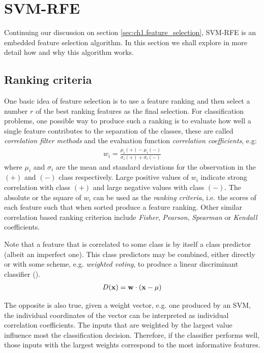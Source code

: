 \section{SVM-RFE}

Continuing our discussion on section \ref{sec:ch1.feature_selection}, SVM-RFE is an embedded feature se\-lec\-tion algorithm. In this section we shall explore in more detail how and why this algorithm works.

\subsection{Ranking criteria}
\label{sec:ch4.rfe.criteria}

One basic idea of feature selection is to use a feature ranking and then select a number $r$ of the best ranking features as the final selection. For classification prob\-lems, one possible way to produce such a ranking is to evaluate how well a single feature contributes to the separation of the classes, these are called \emph{correlation filter methods} and the evaluation function \emph{correlation coefficients}, e.g:
\begin{align*}
    w_i = \frac{\mu_i(+) - \mu_i(-)}{\sigma_i(+) + \sigma_i(-)} 
\end{align*}
where $\mu_i$ and $\sigma_i$ are the mean and standard deviations for the observation in the $(+)$ and $(-)$ class respectively. Large positive values of $w_i$ indicate strong correlation with class $(+)$ and large negative values with class $(-)$. The absolute or the square of $w_i$ can be used as the \emph{ranking criteria}, i.e. the scores of each feature such that when sorted produce a feature ranking. Other similar correlation based ranking criterion include \emph{Fisher}, \emph{Pearson}, \emph{Spearman} or \emph{Kendall} coefficients.

Note that a feature that is correlated to some class is by itself a class predictor (albeit an imperfect one). This class predictors may be combined, either directly or with some scheme, e.g. \emph{weighted voting}, to produce a linear discriminant classifier (\cite{guyon_gene_2002}).
\begin{align*}
    D(\mathbf{x}) = \mathbf{w} \cdot (\mathbf{x} - \mu) 
\end{align*}

The opposite is also true, given a weight vector, e.g. one produced by an SVM, the individual coordinates of the vector can be interpreted as individual correlation coefficients. The inputs that are weighted by the largest value influence most the classification decision. Therefore, if the classifier performs well, those inputs with the largest weights correspond to the most informative features.

